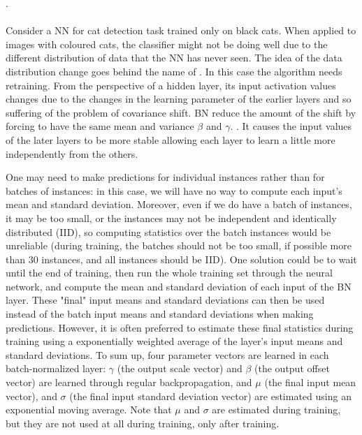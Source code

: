 .

\paragraph{} Consider a NN for cat detection task trained only on black cats. When applied to images with coloured cats, the classifier might not be doing well due to the different distribution of data that the NN has never seen. The idea of the data distribution change goes behind the name of . In this case the algorithm needs retraining. From the perspective of a hidden layer, its input activation values changes due to the changes in the learning parameter of the earlier layers and so suffering of the problem of covariance shift. BN reduce the amount of the shift by forcing to have the same mean and variance $\beta$ and $\gamma$. . It causes the input values of the later layers to be more stable allowing each layer to learn a little more independently from the others.

One may need to make predictions for individual instances rather than for batches of instances: in this case, we will have no way to compute each input's mean and standard deviation. Moreover, even if we do have a batch of instances, it may be too small, or the instances may not be independent and identically distributed (IID), so computing statistics over the batch instances would be unreliable (during training, the batches should not be too small, if possible more than $30$ instances, and all instances should be IID). One solution could be to wait until the end of training, then run the whole training set through the neural network, and compute the mean and standard deviation of each input of the BN layer. These "final" input means and standard deviations can then be used instead of the batch input means and standard deviations when making predictions. However, it is often preferred to estimate these final statistics during training using a exponentially weighted average of the layer's input means and standard deviations. To sum up, four parameter vectors are learned in each batch-normalized layer: $\gamma$ (the output scale vector) and $\beta$ (the output offset vector) are learned through regular backpropagation, and $\mu$ (the final input mean vector), and $\sigma$ (the final input standard deviation vector) are estimated using an exponential moving average. Note that $\mu$ and $\sigma$ are estimated during training, but they are not used at all during training, only after training.

